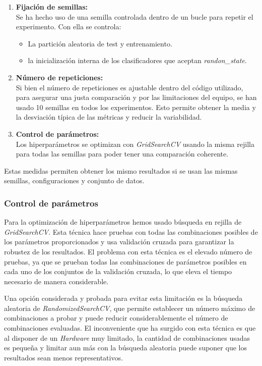 \begin{enumerate}
	\item \textbf{Fijación de semillas:}\\
		Se ha hecho uso de una semilla controlada dentro de un bucle para repetir el experimento. Con ella se controla:

		\begin{itemize}
			\item La partición aleatoria de test y entrenamiento.
			\item la inicialización interna de los clasificadores que aceptan \textit{randon\_state}.
		\end{itemize}
	\item \textbf{Número de repeticiones:}\\
		Si bien el número de repeticiones es ajustable dentro del código utilizado, para asegurar una justa comparación y por las limitaciones del equipo, se han usado 10 semillas en todos los experimentos. Esto permite obtener la media y la desviación típica de las métricas y reducir la variabilidad.
	\item \textbf{Control de parámetros:}\\
		Los hiperparámetros se optimizan con \textit{GridSearchCV} usando la misma rejilla para todas las semillas para poder tener una comparación coherente.
\end{enumerate}

Estas medidas permiten obtener los mismo resultados si se usan las mismas semillas, configuraciones y conjunto de datos.

\subsubsection{Control de parámetros}
\label{subsubsec:control}

Para la optimización de hiperparámetros hemos usado búsqueda en rejilla de \textit{GridSearchCV}. Esta técnica hace pruebas con todas las combinaciones posibles de los parámetros proporcionados y usa validación cruzada para garantizar la robustez de los resultados. El problema con esta técnica es el elevado número de pruebas, ya que se prueban todas las combinaciones de parámetros posibles en cada uno de los conjuntos de la validación cruzada, lo que eleva el tiempo necesario de manera considerable.

\vspace{1em}

Una opción considerada y probada para evitar esta limitación es la búsqueda aleatoria de \textit{RandomizedSearchCV}, que permite establecer un número máximo de combinaciones a probar y puede reducir considerablemente el número de combinaciones evaluadas. El inconveniente que ha surgido con esta técnica es que al disponer de un \textit{Hardware} muy limitado, la cantidad de combinaciones usadas es pequeña y limitar aun más con la búsqueda aleatoria puede suponer que los resultados sean menos representativos.

